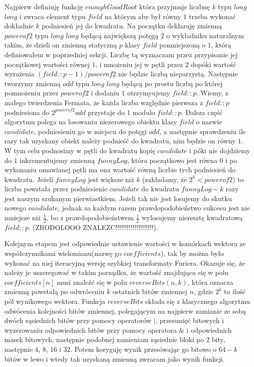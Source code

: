 \documentclass{article}
\begin{document}
Najpierw definiuję funkcję $enoughGoodRoot$ która przyjmuje liczbnę $k$ typu $long$ $long$ i zwraca element typu $field$ na którym aby był równy 
$1$ trzeba wykonać dokładnie $k$ podniesień jej do kwadratu. Na początku deklaruję zmienną $powerof2$ typu $long$ $long$ będącą
największą potęgą $2$ o wykładniku naturalnym takim, że dzieli on zmienną statyczną $p$ klasy $field$ pomniejszoną o $1$, którą definiowałem
w poprzedniej sekcji. Liczbę tą wyznaczam przez przypisanie jej początkowej wartości równej $1$, i mnożeniu jej w pętli przez $2$
dopóki wartość wyrażenia $(field::p-1)/powerof2$ nie będzie liczbą nieparzystą. Następnie tworzymy zmienną $odd$ typu $long$ $long$ będącą po 
prostu liczbą po której pomnożeniu przez $powerof2$ i dodaniu $1$ otrzymyujemy $field::p$. Wiemy, z małego twierdzenia Fermata, że każda liczba względnie 
pierwsza z $field::p$ podniesiona do $2^{powerof2}odd$ przystaje do $1$ modulo $field::p$. Dalsza część algorytmu polega na losowaniu niezerowego obiektu klasy $field$ o nazwie $candidate$,
podniesieniu go w miejscu do potęgi $odd$, a następnie sprawdzeniu ile razy tak uzyskany obiekt należy podnieść do kwadratu, nim będzie on równy $1$. W tym celu podnosimy w pętli do kwadratu
kopię $candidate$ i póki nie dojdziemy do $1$ inkrementujemy zmienną $funnyLog$, która początkowo jest równa $0$ i po wykonaniu omawianej pętli ma ona wartość równą liczbie tych podniesień do kwadratu. Jeżeli $funnyLog$ jest większe niż $k$ (zakładamy, że $2^k<powerof2$) to liczba powstała przez podniesienie $candidate$ do kwadratu $funnyLog-k$ razy
jest naszym szukanym pierwiastkiem. Jeżeli tak nie jest losujemy do skutku nowego $candidate$, jednak za każdym razem prawdopodobieństwo
sukcesu jest nie mniejsze niż $\frac{1}{2}$, bo z prawdopodobieństwem $\frac{1}{2}$ wylosujemy nieresztę kwadratową $field::p$. (ZRODOLOOO ZNALEZC!!!!!!!!!!!!!!!!!!!!).

Kolejnym etapem jest odpowiednie ustawienie wartości w komórkach wektora ze współczynnikami wielomianu(nazwę go $coefficients$), tak by można było wykonać na niej iteracyjną wersję szybkiej transformaty
Furiera. Okazuje się, że należy je uszeregować w takim porządku, że wartość znajdująca się w polu $coefficients[n]$ musi znaleźć
się w polu $reverseBits(n,k)$, która oznacza zmienną powstałą po odwróceniu $k$ ostatnich bitów zmiennej $n$, gdzie 
$2^k$ to ilość pól wynikowego wektora. Funkcja $reverseBits$ składa się z klasycznego algorytmu odwócenia kolejności bitów 
zmiennej, polegającym na najpierw zamianie ze sobą dwóch sąsiednich bitów przy pomocy operatorów $|$, przesunięć bitowych
i wyzerowaniu odpowiednich bitów przy pomocy operatora $\&$ i odpowiednich masek bitowych, następnie podobnej zamieniam sąsiednie bloki
po $2$ bity, następnie $4$, $8$, $16$ i $32$. Potem koryguję wynik przesówając go bitowo o $64-k$ bitów w lewo i wtedy tak uzyskaną zmienną zwracam jako wynik funkcji.
\end{document}
